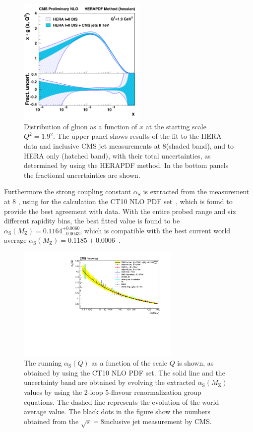 \documentclass{PoS}
\def\as{\ensuremath{\alpha_\mathrm{S}}\xspace}
\def\asq{\ensuremath{\alpha_\mathrm{S}(Q)}\xspace}
\providecommand{\alpsmz}{\ensuremath{\alpha_\mathrm{S}(M_\mathrm{Z})}\xspace}
\begin{document}
\begin{figure}[htp]
\center
   \includegraphics[width=0.55\textwidth]{Figure3b.pdf}
\setlength{\unitlength}{1cm}
\caption{Distribution of gluon as a function of $x$ at the starting scale
  $Q^2=1.9$\GeV$^2$. The upper panel shows results of the fit to the HERA
  data and inclusive CMS jet measurements at 8\TeV (shaded band), and to
  HERA only (hatched band), with their total
  uncertainties, as determined by using the HERAPDF method. In the
  bottom panels the fractional uncertainties are shown.}
\label{fig:pdf}
\end{figure}
Furthermore the strong coupling constant \as is extracted from the measurement at 8 \TeV, using for the calculation the CT10 NLO PDF
set~\cite{Lai:2010vv}, which is found to provide the best agreement with data.
With the entire probed \pt range and six different rapidity bins, the best fitted value is found to be $\alpsmz =
0.1164^{+0.0060}_{-0.0043}$, which is compatible with the best current world average $\alpsmz =
0.1185\pm0.0006$~\cite{Agashe:2014kda}. 
\begin{figure}[htp]
  \centering
 \includegraphics[width=0.70\textwidth]{Figure4.pdf}
 \caption{The running \asq as a function of the scale $Q$ is shown, as
   obtained by using the CT10 NLO PDF set. The solid line and the
   uncertainty band are obtained by evolving the extracted \alpsmz
   values by using the 2-loop 5-flavour renormalization group
   equations. The dashed line represents the evolution of the world
   average value. The black dots in the figure show the numbers
   obtained from the $\sqrt{s}=8$\TeV inclusive jet
   measurement by CMS. %
 }
\label{fig:AlphasRun}
\end{figure}
\end{document}
